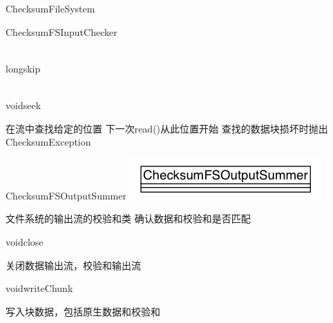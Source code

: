 \begin{XeClass}{ChecksumFileSystem}
\begin{XeInnerClass}{ChecksumFSInputChecker}
\begin{XeMethod}{\XePublic \\ \XeSync}{long}{skip}
        \end{XeMethod}

        \begin{XeMethod}{\XePublic \\ \XeSync}{void}{seek}
             
 在流中查找给定的位置
 下一次read()从此位置开始
 查找的数据块损坏时抛出ChecksumException 

        \end{XeMethod}

    \end{XeInnerClass}
    \begin{XeInnerClass}{ChecksumFSOutputSummer}
\includegraphics[width=\textwidth]{cdig/ChecksumFSOutputSummer.png}
         
 文件系统的输出流的校验和类
 确认数据和校验和是否匹配

        \begin{XeMethod}{\XePublic}{void}{close}
             
 关闭数据输出流，校验和输出流

        \end{XeMethod}

        \begin{XeMethod}{\XeProtected}{void}{writeChunk}
             
 写入块数据，包括原生数据和校验和

        \end{XeMethod}

    \end{XeInnerClass}
\end{XeClass}
